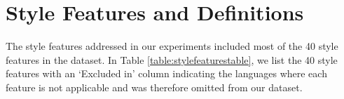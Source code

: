 \clearpage

\section{Style Features and Definitions}
\label{sec:appendix:stylefeatures}

The style features addressed in our experiments included most of the %
40 style features in the %
\citet{patel2024styledistancestrongercontentindependentstyle} dataset.
In Table \ref{table:stylefeaturestable}, we list the 40 style features with an `Excluded in' column indicating the languages where each feature is not applicable and was therefore omitted from our dataset.
